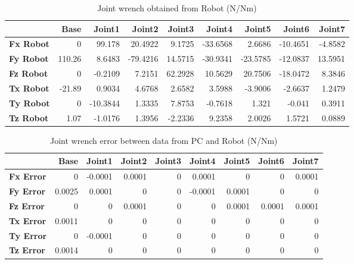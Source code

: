 \begin{table}[h!]
	\centering
	\caption{Joint wrench obtained from Robot (N/Nm)}
	\label{wrech_Robot_Pose5}
	\begin{tabular}{|l|r|r|r|r|r|r|r|r|}
		\hline
		\textbf{} & \textbf{Base} & \textbf{Joint1}  & \textbf{Joint2}  & \textbf{Joint3}  & \textbf{Joint4}  & \textbf{Joint5}  & \textbf{Joint6}  & \textbf{Joint7} \\ \hline
		\textbf{Fx Robot}  & 0        & 99.178        & 20.4922        & 9.1725        & -33.6568        & 2.6686        & -10.4651        & -4.8582 \\ \hline
		\textbf{Fy Robot}  & 110.26        & 8.6483        & -79.4216        & 14.5715        & -30.9341        & -23.5785        & -12.0837        & 13.5951 \\ \hline
		\textbf{Fz Robot}  & 0        & -0.2109        & 7.2151        & 62.2928        & 10.5629        & 20.7506        & -18.0472        & 8.3846 \\ \hline
		\textbf{Tx Robot}  & -21.89        & 0.9034        & 4.6768        & 2.6582        & 3.5988        & -3.9006        & -2.6637        & 1.2479 \\ \hline
		\textbf{Ty Robot}  & 0        & -10.3844        & 1.3335        & 7.8753        & -0.7618        & 1.321        & -0.041        & 0.3911 \\ \hline
		\textbf{Tz Robot}  & 1.07        & -1.0176        & 1.3956        & -2.2336        & 9.2358        & 2.0026        & 1.5721        & 0.0889 \\ \hline
	\end{tabular}
\end{table}

\begin{table}[h!]
	\centering
	\caption{Joint wrench error between data from PC and Robot (N/Nm)}
	\label{wrech_Error_Pose5}
	\begin{tabular}{|l|r|r|r|r|r|r|r|r|}
		\hline
		\textbf{}  & \textbf{Base} & \textbf{Joint1}  & \textbf{Joint2}  & \textbf{Joint3}  & \textbf{Joint4}  & \textbf{Joint5}  & \textbf{Joint6}  & \textbf{Joint7} \\ \hline
		\textbf{Fx Error}  & 0        & -0.0001        & 0.0001        & 0        & 0.0001        & 0        & 0        & 0.0001 \\ \hline
		\textbf{Fy Error}  & 0.0025        & 0.0001        & 0        & 0        & -0.0001        & 0.0001        & 0        & 0 \\ \hline
		\textbf{Fz Error}  & 0        & 0        & 0.0001        & 0        & 0        & 0.0001        & 0.0001        & 0.0001 \\ \hline
		\textbf{Tx Error}  & 0.0011        & 0        & 0        & 0        & 0        & 0        & 0        & 0 \\ \hline
		\textbf{Ty Error}  & 0        & -0.0001        & 0        & 0        & 0        & 0        & 0        & 0 \\ \hline
		\textbf{Tz Error}  & 0.0014        & 0        & 0        & 0        & 0        & 0        & 0        & 0 \\ \hline
	\end{tabular}
\end{table}

